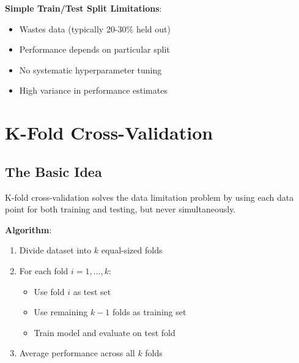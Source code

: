 \documentclass{article}
\begin{document}
\textbf{Simple Train/Test Split Limitations}:
\begin{itemize}
    \item Wastes data (typically 20-30\% held out)
    \item Performance depends on particular split
    \item No systematic hyperparameter tuning
    \item High variance in performance estimates
\end{itemize}

\section{K-Fold Cross-Validation}

\subsection{The Basic Idea}

K-fold cross-validation solves the data limitation problem by using each data point for both training and testing, but never simultaneously.

\textbf{Algorithm}:
\begin{enumerate}
    \item Divide dataset into $k$ equal-sized folds
    \item For each fold $i = 1, \ldots, k$:
    \begin{itemize}
        \item Use fold $i$ as test set
        \item Use remaining $k-1$ folds as training set
        \item Train model and evaluate on test fold
    \end{itemize}
    \item Average performance across all $k$ folds
\end{enumerate}
\end{document}
